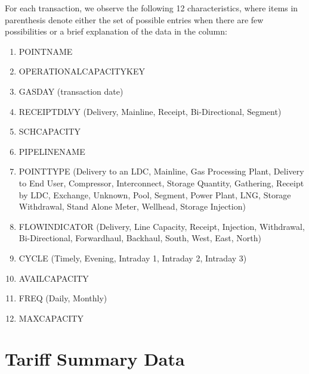 \documentclass{article}
\newcommand{\1}{\mathbbm{1}}
\theoremstyle{definition}
\begin{document}
For each transaction, we observe the following 12 characteristics, where items in parenthesis denote either the set of possible entries when there are few possibilities or a brief explanation of the data in the column:
\begin{enumerate}
    \item POINT\textunderscore NAME
    \item OPERATIONAL\textunderscore CAPACITY\textunderscore KEY
    \item GAS\textunderscore DAY (transaction date)
    \item RECEIPT\textunderscore DLVY (Delivery, Mainline, Receipt, Bi-Directional, Segment)
    \item SCH\textunderscore CAPACITY
    \item PIPELINE\textunderscore NAME
    \item POINT\textunderscore TYPE (Delivery to an LDC, Mainline, Gas Processing Plant, Delivery to End User, Compressor, Interconnect, Storage Quantity, Gathering, Receipt by LDC, Exchange, Unknown, Pool, Segment, Power Plant, LNG, Storage Withdrawal, Stand Alone Meter, Wellhead, Storage Injection)
    \item FLOW\textunderscore INDICATOR (Delivery, Line Capacity, Receipt, Injection, Withdrawal, Bi-Directional, Forwardhaul, Backhaul, South, West, East, North)
    \item CYCLE (Timely, Evening, Intraday 1, Intraday 2, Intraday 3)
    \item AVAIL\textunderscore CAPACITY
    \item FREQ (Daily, Monthly)
    \item MAX\textunderscore CAPACITY
\end{enumerate}

\section{Tariff Summary Data}
\end{document}
